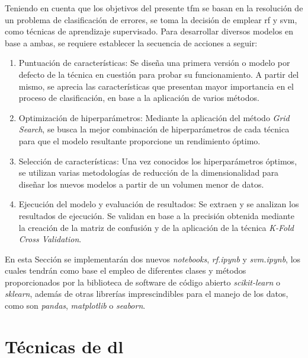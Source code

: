 Teniendo en cuenta que los objetivos del presente \gls{tfm} se basan en la resolución de un problema de clasificación de errores, se toma la decisión de emplear \gls{rf} y \gls{svm}, como técnicas de aprendizaje supervisado. Para desarrollar diversos modelos en base a ambas, se requiere establecer la  secuencia de acciones a seguir: 

\begin{enumerate}
    \item Puntuación de características: Se diseña una primera versión o modelo por defecto de la técnica en cuestión para probar su funcionamiento. A partir del mismo, se aprecia las características que presentan mayor importancia en el proceso de clasificación, en base a la aplicación de varios métodos. 
    \item Optimización de hiperparámetros: Mediante la aplicación del método \textit{Grid Search}, se busca la mejor combinación de hiperparámetros de cada técnica para que el modelo resultante proporcione un rendimiento óptimo. 
    \item Selección de características: Una vez conocidos los hiperparámetros óptimos, se utilizan varias metodologías de reducción de la dimensionalidad para diseñar los nuevos modelos a partir de un volumen menor de datos.
    \item Ejecución del modelo y evaluación de resultados: Se extraen y se analizan los resultados de ejecución. Se validan en base a la precisión obtenida mediante la creación de la matriz de confusión y de la aplicación de la técnica \textit{K-Fold Cross Validation}.
\end{enumerate}

En esta Sección se implementarán dos nuevos \textit{notebooks}, \textit{rf.ipynb} y \textit{svm.ipynb}, los cuales tendrán como base el empleo de diferentes clases y métodos proporcionados por la biblioteca de software de código abierto \textit{scikit-learn} o \textit{sklearn}, además de otras librerías imprescindibles para el manejo de los datos, como son \textit{pandas}, \textit{matplotlib} o \textit{seaborn}. 




\section{Técnicas de \gls{dl}}
\label{sec:tecnicasdl}

